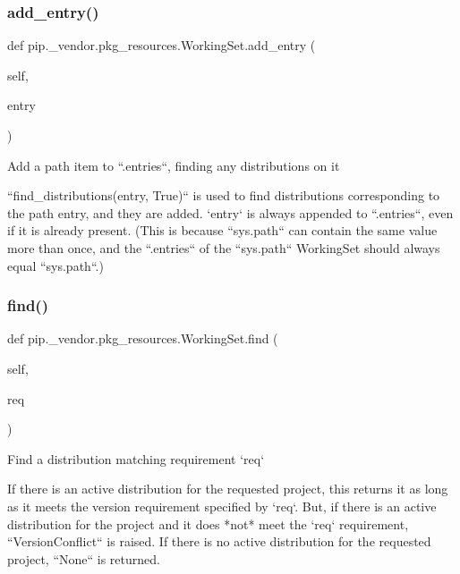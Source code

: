 \subsubsection{\texorpdfstring{add\+\_\+entry()}{add\_entry()}}
{\footnotesize\ttfamily def pip.\+\_\+vendor.\+pkg\+\_\+resources.\+Working\+Set.\+add\+\_\+entry (\begin{DoxyParamCaption}\item[{}]{self,  }\item[{}]{entry }\end{DoxyParamCaption})}

\begin{DoxyVerb}Add a path item to ``.entries``, finding any distributions on it

``find_distributions(entry, True)`` is used to find distributions
corresponding to the path entry, and they are added.  `entry` is
always appended to ``.entries``, even if it is already present.
(This is because ``sys.path`` can contain the same value more than
once, and the ``.entries`` of the ``sys.path`` WorkingSet should always
equal ``sys.path``.)
\end{DoxyVerb}
 \mbox{\label{classpip_1_1__vendor_1_1pkg__resources_1_1WorkingSet_a08fa1c61ff31ce49ee1a58cfc02fd315}} 
\subsubsection{\texorpdfstring{find()}{find()}}
{\footnotesize\ttfamily def pip.\+\_\+vendor.\+pkg\+\_\+resources.\+Working\+Set.\+find (\begin{DoxyParamCaption}\item[{}]{self,  }\item[{}]{req }\end{DoxyParamCaption})}

\begin{DoxyVerb}Find a distribution matching requirement `req`

If there is an active distribution for the requested project, this
returns it as long as it meets the version requirement specified by
`req`.  But, if there is an active distribution for the project and it
does *not* meet the `req` requirement, ``VersionConflict`` is raised.
If there is no active distribution for the requested project, ``None``
is returned.
\end{DoxyVerb}
 \mbox{\label{classpip_1_1__vendor_1_1pkg__resources_1_1WorkingSet_a60d3acb4eda7ccfc93f14003ea0bca90}} 
